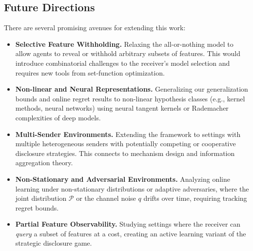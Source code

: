 \subsection{Future Directions}
\label{sec:future}

There are several promising avenues for extending this work:

\begin{itemize}
    \item \textbf{Selective Feature Withholding.} Relaxing the all-or-nothing model to allow agents to reveal or withhold arbitrary subsets of features. This would introduce combinatorial challenges to the receiver's model selection and requires new tools from set-function optimization.
    
    \item \textbf{Non-linear and Neural Representations.} Generalizing our generalization bounds and online regret results to non-linear hypothesis classes (e.g., kernel methods, neural networks) using neural tangent kernels or Rademacher complexities of deep models.
    
    \item \textbf{Multi-Sender Environments.} Extending the framework to settings with multiple heterogeneous senders with potentially competing or cooperative disclosure strategies. This connects to mechanism design and information aggregation theory.
    
    \item \textbf{Non-Stationary and Adversarial Environments.} Analyzing online learning under non-stationary distributions or adaptive adversaries, where the joint distribution $\mathcal{P}$ or the channel noise $q$ drifts over time, requiring tracking regret bounds.
    
    \item \textbf{Partial Feature Observability.} Studying settings where the receiver can \emph{query} a subset of features at a cost, creating an active learning variant of the strategic disclosure game.
\end{itemize}
